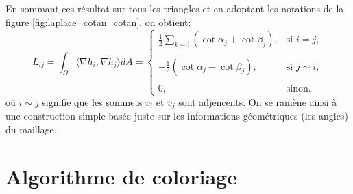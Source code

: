 En sommant ces résultat sur tous les triangles et en adoptant les notations de la figure \ref{fig:laplace_cotan_cotan}, on obtient:
\[
L_{ij} =\displaystyle\int_\Omega \langle \nabla h_i, \nabla h_j \rangle dA=
\begin{cases}
\displaystyle\frac{1}{2} \sum_{k\sim i} (\cot \alpha_j + \cot \beta_j), & \text{si } i = j, \\\\
-\displaystyle\frac{1}{2} (\cot \alpha_j + \cot \beta_j), & \text{si } j \sim i, \\\\
0, & \text{sinon}.
\end{cases}
\]
où $i \sim j$ signifie que les sommets $v_i$ et $v_j$ sont adjencents. On se ramène ainsi à une construction simple basée juste sur les informations géométriques (les angles) du maillage.


\chapter{Algorithme de coloriage}
\label{algo_glouton}

